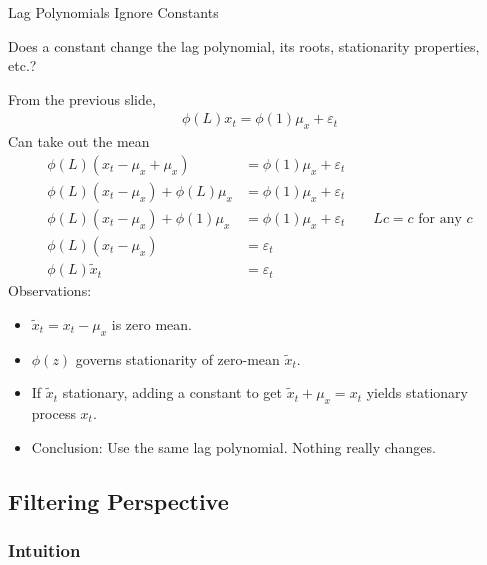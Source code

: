 \documentclass[aspectratio=169, handout]{beamer}
\begin{document}
{\scriptsize
\begin{frame}{Lag Polynomials Ignore Constants}

Does a constant change the lag polynomial, its
roots, stationarity properties, etc.?

From the previous slide,
\begin{align*}
  \phi(L)x_t
  =
  \phi(1)\mu_x + \varepsilon_t
\end{align*}
Can take out the mean
\begin{align*}
  \phi(L)(x_t-\mu_x+\mu_x)
  &=
  \phi(1)\mu_x + \varepsilon_t
  \\
  \phi(L)(x_t-\mu_x)+\phi(L)\mu_x
  &=
  \phi(1)\mu_x + \varepsilon_t
  \\
  \phi(L)(x_t-\mu_x)+\phi(1)\mu_x
  &=
  \phi(1)\mu_x + \varepsilon_t
  \qquad
  \text{$Lc=c$ for any $c$}
  \\
  \phi(L)(x_t-\mu_x)
  &=
  \varepsilon_t
  \\
  \phi(L)\tilde{x}_t
  &=
  \varepsilon_t
\end{align*}
Observations:
\begin{itemize}
  \item $\tilde{x}_t=x_t-\mu_x$ is zero mean.
  \item $\phi(z)$ governs stationarity of zero-mean
    $\tilde{x}_t$.
  \item If $\tilde{x}_t$ stationary, adding a \alert{constant}
    to get $\tilde{x}_t+\mu_x=x_t$ yields stationary process $x_t$.
  \item Conclusion: Use the same lag polynomial.
    Nothing really changes.
\end{itemize}
\end{frame}
}



\subsection{Filtering Perspective}

\subsubsection{Intuition}
\end{document}
